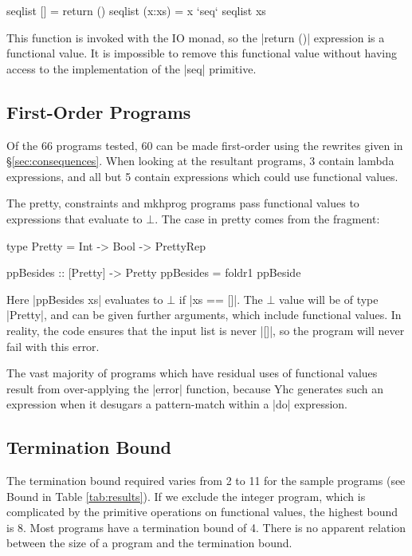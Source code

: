 \documentclass[preprint]{sigplanconf}
\begin{document}
\begin{code}
seqlist []      = return ()
seqlist (x:xs)  = x `seq` seqlist xs
\end{code}

This function is invoked with the IO monad, so the |return ()| expression is a functional value. It is impossible to remove this functional value without having access to the implementation of the |seq| primitive.

\subsection{First-Order Programs}

Of the 66 programs tested, 60 can be made first-order using the rewrites given in \S\ref{sec:consequences}. When looking at the resultant programs, 3 contain lambda expressions, and all but 5 contain expressions which could use functional values.

The pretty, constraints and mkhprog programs pass functional values to expressions that evaluate to $\bot$. The case in pretty comes from the fragment:

\begin{comment}
\begin{code}
data PrettyRep = PrettyRep
ppBeside :: Pretty -> Pretty -> Pretty
\end{code}
\end{comment}
\begin{code}
type Pretty = Int -> Bool -> PrettyRep

ppBesides :: [Pretty] -> Pretty
ppBesides = foldr1 ppBeside
\end{code}

Here |ppBesides xs| evaluates to $\bot$ if |xs == []|. The $\bot$ value will be of type |Pretty|, and can be given further arguments, which include functional values. In reality, the code ensures that the input list is never |[]|, so the program will never fail with this error.

The vast majority of programs which have residual uses of functional values result from over-applying the |error| function, because Yhc generates such an expression when it desugars a pattern-match within a |do| expression.

\subsection{Termination Bound}

The termination bound required varies from 2 to 11 for the sample programs (see Bound in Table \ref{tab:results}). If we exclude the integer program, which is complicated by the primitive operations on functional values, the highest bound is 8. Most programs have a termination bound of 4. There is no apparent relation between the size of a program and the termination bound.
\end{document}
